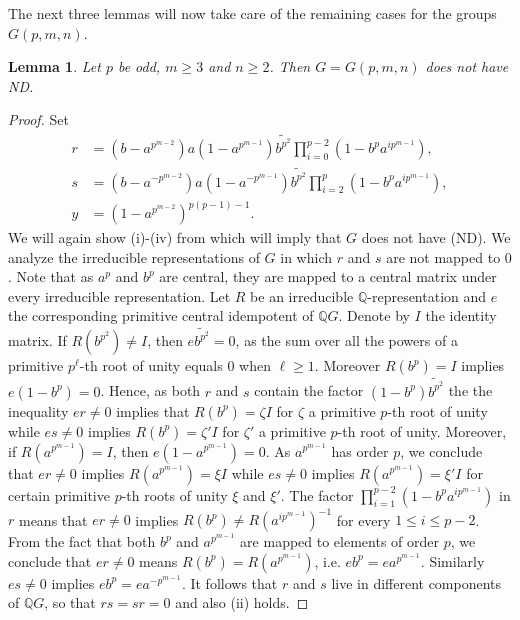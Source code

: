 \documentclass[a4paper,10pt]{amsart}
\newtheorem{lemma}{Lemma}[section]
\theoremstyle{definition}
\theoremstyle{remark}
\begin{document}
The next three lemmas will now take care of the remaining cases for the groups $G(p,m,n)$.

\begin{lemma}\label{lem:GpmnOddCase1}
Let $p$ be odd, $m \geq 3$ and $n \geq 2$. Then $G = G(p,m,n)$ does not have ND. 
\end{lemma}
\begin{proof}
Set
\begin{align*}
r &= (b - a^{p^{m-2}})a(1-a^{p^{m-1}}) \widetilde{b^{p^2}} \prod_{i=0}^{p-2}(1-b^pa^{ip^{m-1}}), \\
s &= (b- a^{-p^{m-2}})a(1-a^{-p^{m-1}}) \widetilde{b^{p^2}} \prod_{i=2}^p (1- b^pa^{ip^{m-1}}),\\
y &= (1-a^{p^{m-2}})^{p(p-1)-1}.
\end{align*}
We will again show (i)-(iv) from  which will imply that $G$ does not have (ND). We analyze the irreducible representations of $G$ in which $r$ and $s$ are not mapped to $0$. Note that as $a^p$ and $b^p$ are central, they are mapped to a central matrix under every irreducible representation. Let $R$ be an irreducible $\mathbb{Q}$-representation and $e$ the corresponding primitive central idempotent of $\mathbb{Q}G$. Denote by $I$ the identity matrix. If $R(b^{p^2}) \neq I$, then $e\widetilde{b^{p^2}} = 0$, as the sum over all the powers of a primitive $p^\ell$-th root of unity equals $0$ when $\ell \geq 1$. Moreover $R(b^p) = I$ implies $e(1-b^p) = 0$. Hence, as both $r$ and $s$ contain the factor $(1-b^p)\widetilde{b^{p^2}}$ the the inequality $er \neq 0$ implies that $R(b^p) = \zeta I$ for $\zeta$ a primitive $p$-th root of unity while $es \neq 0$ implies $R(b^p) = \zeta'I$ for $\zeta'$ a primitive $p$-th root of unity. Moreover, if $R(a^{p^{m-1}}) = I$, then $e(1-a^{p^{m-1}}) = 0$. As $a^{p^{m-1}}$ has order $p$, we conclude that $er \neq 0$ implies $R(a^{p^{m-1}}) = \xi I$ while $es \neq 0$ implies $R(a^{p^{m-1}}) = \xi'I$ for certain primitive $p$-th roots of unity $\xi$ and $\xi'$. The factor $\prod_{i=1}^{p-2} (1-b^p a^{ip^{m-1}})$ in $r$ means that $er \neq 0$ implies $R(b^p) \neq R(a^{ip^{m-1}})^{-1}$ for every $1 \leq i \leq p-2$. From the fact that both $b^p$ and $a^{p^{m-1}}$ are mapped to elements of order $p$, we conclude that $er \neq 0$ means $R(b^p) = R(a^{p^{m-1}})$, i.e. $eb^p = ea^{p^{m-1}}$. Similarly $es \ne 0$ implies $eb^p = ea^{-p^{m-1}}$. It follows that $r$ and $s$ live in different components of $\mathbb{Q}G$, so that $rs = sr = 0$ and also (ii) holds.


\end{proof}
\end{document}

